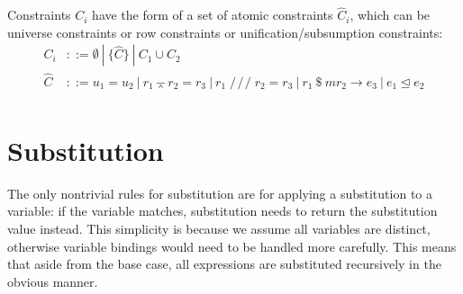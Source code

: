 \documentclass[11pt, twoside, reqno]{book}
\newcommand{\subsumedBy}{\unlhd}
\providecommand{\wedgeonwedge}{\barwedge}
\begin{document}
\begin{appdices}
Constraints \(C_i\) have the form of a set of atomic constraints \(\hat C_i\), which can be universe constraints or row constraints or unification/subsumption constraints:
\begin{align*}
C_i
  & ::= \emptyset\ |\ \{\hat C\}\ |\ C_1 \cup C_2\\
\hat C
  & ::= u_1 = u_2\ |\ r_1 \wedgeonwedge r_2 = r_3\ |\ r_1 \mathop{/\!/\!/} r_2 = r_3\ |\ r_1\ \$\ mr_2 \to e_3\ |\ e_1 \subsumedBy e_2\\
\end{align*}

\section{Substitution}
The only nontrivial rules for substitution are for applying a substitution to a variable: if the variable matches, substitution needs to return the substitution value instead.
This simplicity is because we assume all variables are distinct, otherwise variable bindings would need to be handled more carefully.
This means that aside from the base case, all expressions are substituted recursively in the obvious manner.


\end{appdices}
\end{document}
